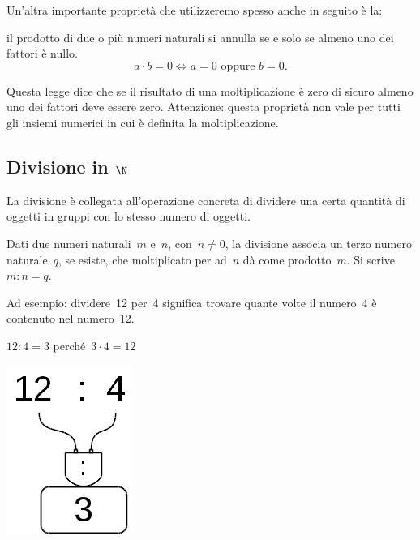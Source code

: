 Un'altra importante proprietà che utilizzeremo spesso anche in seguito è la:

\begin{legge}
il prodotto di due o più numeri naturali si annulla se e solo se almeno uno 
dei fattori è nullo.
\[ a\cdot b=0\Leftrightarrow a=0\text{ oppure }b=0. \]
\end{legge}

Questa legge dice che se il risultato di una moltiplicazione è zero di 
sicuro almeno uno dei fattori deve essere zero. Attenzione: questa proprietà 
non vale per tutti gli insiemi numerici in cui è definita la 
moltiplicazione.

\subsection{Divisione in $\N$}

La divisione è collegata all'operazione concreta di dividere una certa
quantità di oggetti in gruppi con lo stesso numero di oggetti.

\begin{definizione}
Dati due numeri naturali~\(m\) e~\(n\), con~\(n \neq 0\), la divisione 
associa 
un terzo numero naturale~\(q\), se esiste, che moltiplicato per ad~\(n\) dà 
come prodotto~\(m\).
Si scrive~\(m : n = q\).
\end{definizione}

Ad esempio: dividere~12 per~4 significa trovare quante volte il numero~4 è 
contenuto nel numero~12.

\begin{minipage}{0.80\textwidth}
 \centering
 \(12 : 4 = 3\) perché~\(3 \cdot 4 = 12\)

% 
\end{minipage}%
\begin{minipage}{0.15\textwidth}
 \centering
\begin{inaccessibleblock}[]
 \includegraphics[scale=0.35]{img/op_div.png}
\end{inaccessibleblock}
\end{minipage}%

